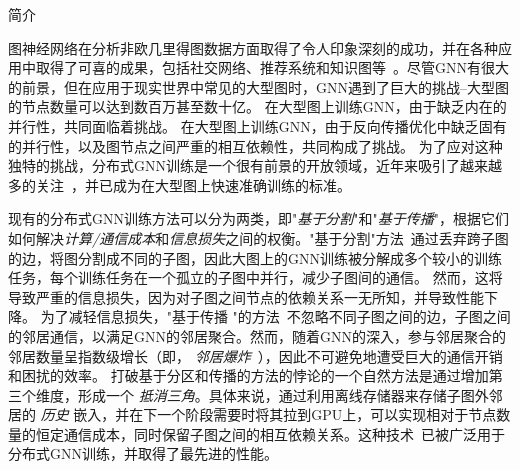 \begin{section}{简介}
    
图神经网络在分析非欧几里得图数据方面取得了令人印象深刻的成功，并在各种应用中取得了可喜的成果，包括社交网络、推荐系统和知识图等~\cite{dai2016discriminative,ying2018graph,lei2019gcn}。尽管GNN有很大的前景，但在应用于现实世界中常见的大型图时，GNN遇到了巨大的挑战--大型图的节点数量可以达到数百万甚至数十亿。
在大型图上训练GNN，由于缺乏内在的并行性，共同面临着挑战。
在大型图上训练GNN，由于反向传播优化中缺乏固有的并行性，以及图节点之间严重的相互依赖性，共同构成了挑战。
为了应对这种独特的挑战，分布式GNN训练是一个很有前景的开放领域，近年来吸引了越来越多的关注~\cite{dorylus_osdi21,ramezani2021learn,wan2022pipegcn,chai2022distributed}，并已成为在大型图上快速准确训练的标准。



现有的分布式GNN训练方法可以分为两类，即"\emph{基于分割}"和"\emph{基于传播}"，根据它们如何解决\emph{计算/通信成本}和\emph{信息损失}之间的权衡。"基于分割"方法~\cite{angerd2020distributed,jia2020improving,ramezani2021learn}通过丢弃跨子图的边，将图分割成不同的子图，因此大图上的GNN训练被分解成多个较小的训练任务，每个训练任务在一个孤立的子图中并行，减少子图间的通信。
然而，这将导致严重的信息损失，因为对子图之间节点的依赖关系一无所知，并导致性能下降。
为了减轻信息损失，"基于传播 "的方法~\cite{ma2019neugraph,zhu2019aligraph,zheng2020distdgl,tripathy2020reducing}不忽略不同子图之间的边，子图之间的邻居通信，以满足GNN的邻居聚合。然而，随着GNN的深入，参与邻居聚合的邻居数量呈指数级增长（即， \emph{邻居爆炸}~\cite{hamilton2017inductive}），因此不可避免地遭受巨大的通信开销和困扰的效率。
打破基于分区和传播的方法的悖论的一个自然方法是通过增加第三个维度，形成一个 \emph{抵消三角}。具体来说，通过利用离线存储器来存储子图外邻居的 \emph{历史} 嵌入，并在下一个阶段需要时将其拉到GPU上，可以实现相对于节点数量的恒定通信成本，同时保留子图之间的相互依赖关系。这种技术~\cite{chen2018stochastic,fey2021gnnautoscale,wan2022pipegcn,chai2022distributed}已被广泛用于分布式GNN训练，并取得了最先进的性能。
\end{section}
